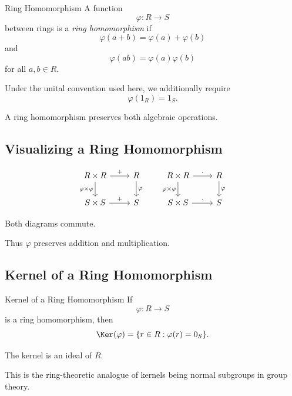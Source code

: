 \begin{definitionbox}{Ring Homomorphism}
A function
\[ \varphi:R\to S \]
between rings is a \emph{ring homomorphism} if
\[ \varphi(a+b)=\varphi(a)+\varphi(b) \]
and
\[ \varphi(ab)=\varphi(a)\varphi(b) \]
for all \(a,b\in R\).

Under the unital convention used here, we additionally require
\[ \varphi(1_R)=1_S. \]
\end{definitionbox}

A ring homomorphism preserves both algebraic operations.

\subsection{Visualizing a Ring Homomorphism}
\label{subsec:visual-ring-homomorphism}

\[
\begin{tikzcd}
R\times R \arrow[r,"+"] \arrow[d,"\varphi\times\varphi"'] &
R \arrow[d,"\varphi"]\\
S\times S \arrow[r,"+"] &
S
\end{tikzcd}
\qquad
\begin{tikzcd}
R\times R \arrow[r,"\cdot"] \arrow[d,"\varphi\times\varphi"'] &
R \arrow[d,"\varphi"]\\
S\times S \arrow[r,"\cdot"] &
S
\end{tikzcd}
\]

Both diagrams commute.

Thus \(\varphi\) preserves addition and multiplication.

\subsection{Kernel of a Ring Homomorphism}
\label{subsec:ring-kernel}

\begin{definitionbox}{Kernel of a Ring Homomorphism}
If
\[ \varphi:R\to S \]
is a ring homomorphism, then
\[ \Ker(\varphi)=\{r\in R:\varphi(r)=0_S\}. \]
\end{definitionbox}

The kernel is an ideal of \(R\).

This is the ring-theoretic analogue of kernels being normal subgroups in group
theory.

